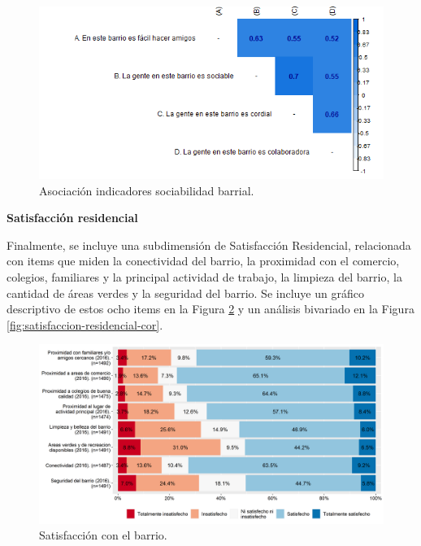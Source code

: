 \documentclass[
  12pt,
]{book}
\begin{document}
\begin{figure}[H]

{\centering \includegraphics[width=1\linewidth,height=1\textheight]{output/graphs/sociabilidad-barrial_cor} 

}

\caption{Asociación indicadores sociabilidad barrial.}\label{fig:sociabilidad-barrial-cor}
\end{figure}

\textbf{Satisfacción residencial}

Finalmente, se incluye una subdimensión de Satisfacción Residencial, relacionada con items que miden la conectividad del barrio, la proximidad con el comercio, colegios, familiares y la principal actividad de trabajo, la limpieza del barrio, la cantidad de áreas verdes y la seguridad del barrio. Se incluye un gráfico descriptivo de estos ocho items en la Figura \ref{fig:satisfaccion-residencial} y un análisis bivariado en la Figura \ref{fig:satisfaccion-residencial-cor}.

\begin{figure}[H]

{\centering \includegraphics[width=1\linewidth,height=1\textheight]{output/graphs/satisfaccion-residencial} 

}

\caption{Satisfacción con el barrio.}\label{fig:satisfaccion-residencial}
\end{figure}
\end{document}
